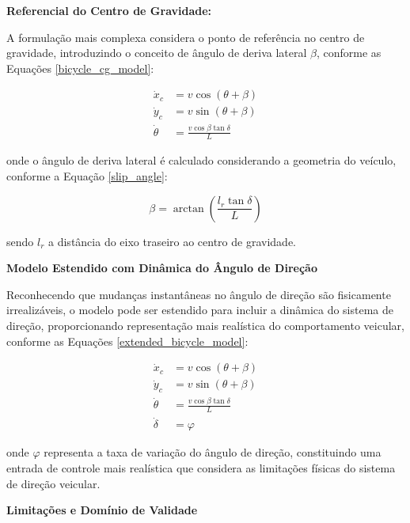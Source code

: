 \textbf{Referencial do Centro de Gravidade:}

A formulação mais complexa considera o ponto de referência no centro de gravidade, introduzindo o conceito de ângulo de deriva lateral $\beta$, conforme as Equações \ref{bicycle_cg_model}:

\begin{equation} \label{bicycle_cg_model}
\begin{aligned}
\dot{x}_c &= v \cos(\theta + \beta) \\
\dot{y}_c &= v \sin(\theta + \beta) \\
\dot{\theta} &= \frac{v \cos \beta \tan \delta}{L}
\end{aligned}
\end{equation}

onde o ângulo de deriva lateral é calculado considerando a geometria do veículo, conforme a Equação \ref{slip_angle}:

\begin{equation} \label{slip_angle}
\beta = \arctan\left(\frac{l_r \tan \delta}{L}\right)
\end{equation}

sendo $l_r$ a distância do eixo traseiro ao centro de gravidade.

\textbf{Modelo Estendido com Dinâmica do Ângulo de Direção}

Reconhecendo que mudanças instantâneas no ângulo de direção são fisicamente irrealizáveis, o modelo pode ser estendido para incluir a dinâmica do sistema de direção, proporcionando representação mais realística do comportamento veicular, conforme as Equações \ref{extended_bicycle_model}:

\begin{equation} \label{extended_bicycle_model}
\begin{aligned}
\dot{x}_c &= v \cos(\theta + \beta) \\
\dot{y}_c &= v \sin(\theta + \beta) \\
\dot{\theta} &= \frac{v \cos \beta \tan \delta}{L} \\
\dot{\delta} &= \varphi
\end{aligned}
\end{equation}

onde $\varphi$ representa a taxa de variação do ângulo de direção, constituindo uma entrada de controle mais realística que considera as limitações físicas do sistema de direção veicular.

\textbf{Limitações e Domínio de Validade}

